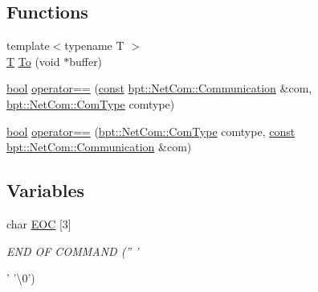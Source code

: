 \subsection*{Functions}
\begin{DoxyCompactItemize}
\item 
{\footnotesize template$<$typename T $>$ }\\\hyperlink{curses_8priv_8h_a5ef253115820acf7d27f3c5c3b02a0f0}{T} \hyperlink{namespacebpt_1_1_net_com_aa7d8a46c22239819de32e017056ee2e9}{To} (void $\ast$buffer)
\item 
\hyperlink{term__entry_8h_a002004ba5d663f149f6c38064926abac}{bool} \hyperlink{namespacebpt_1_1_net_com_a5938049449df6343027fef880dcc1768}{operator==} (\hyperlink{term__entry_8h_a57bd63ce7f9a353488880e3de6692d5a}{const} \hyperlink{namespacebpt_1_1_net_com_af30d27373a967c6e6bcbf97963e2ab1d}{bpt\-::\-Net\-Com\-::\-Communication} \&com, \hyperlink{namespacebpt_1_1_net_com_a73b47b2b099bf7d28997dc72c921212c}{bpt\-::\-Net\-Com\-::\-Com\-Type} comtype)
\item 
\hyperlink{term__entry_8h_a002004ba5d663f149f6c38064926abac}{bool} \hyperlink{namespacebpt_1_1_net_com_a8c3723f2c4e82e50fae7157a5d40278b}{operator==} (\hyperlink{namespacebpt_1_1_net_com_a73b47b2b099bf7d28997dc72c921212c}{bpt\-::\-Net\-Com\-::\-Com\-Type} comtype, \hyperlink{term__entry_8h_a57bd63ce7f9a353488880e3de6692d5a}{const} \hyperlink{namespacebpt_1_1_net_com_af30d27373a967c6e6bcbf97963e2ab1d}{bpt\-::\-Net\-Com\-::\-Communication} \&com)
\end{DoxyCompactItemize}
\subsection*{Variables}
\begin{DoxyCompactItemize}
\item 
char \hyperlink{namespacebpt_1_1_net_com_a34151047272d9eaf1e68367bc276e11a}{E\-O\-C} \mbox{[}3\mbox{]}
\begin{DoxyCompactList}\small\item\em E\-N\-D O\-F C\-O\-M\-M\-A\-N\-D ('' '\par
' '\textbackslash{}0') \end{DoxyCompactList}\end{DoxyCompactItemize}


